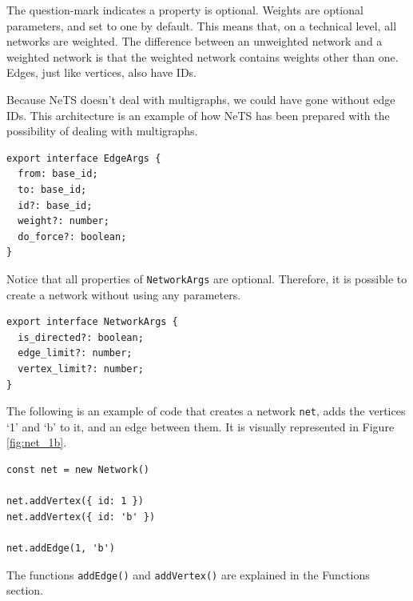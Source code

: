 The question-mark indicates a property is optional.
Weights are optional parameters, and set to one by default.
This means that, on a technical level, all networks are weighted.
The difference between an unweighted network and a weighted network
is that the weighted network contains weights other than one.
Edges, just like vertices, also have IDs.

Because NeTS doesn't deal with multigraphs, we
could have gone without edge IDs.
This architecture is an example of how NeTS
has been prepared with the possibility of dealing
with multigraphs.

\begin{verbatim}
export interface EdgeArgs {
  from: base_id;
  to: base_id;
  id?: base_id;
  weight?: number;
  do_force?: boolean;
}
\end{verbatim}

Notice that all properties of \texttt{NetworkArgs} are optional.
Therefore, it is possible to create a network without using any parameters.

\begin{verbatim}
export interface NetworkArgs {
  is_directed?: boolean;
  edge_limit?: number;
  vertex_limit?: number;
}
\end{verbatim}

The following is an example of code that creates a network \texttt{net},
adds the vertices `1' and `b' to it, and an edge between them.
It is visually represented in Figure \ref{fig:net_1b}.

\begin{verbatim}
const net = new Network()

net.addVertex({ id: 1 })
net.addVertex({ id: 'b' })

net.addEdge(1, 'b')
\end{verbatim}

The functions \texttt{addEdge()} and \texttt{addVertex()}
are explained in the Functions section.

